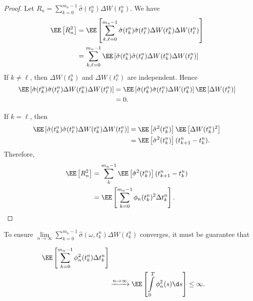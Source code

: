 \begin{proof}
    Let $R_n=\sum\limits_{k=0}^{m_n-1} \hat{\sigma}(t_k^n)\Delta W(t^n_{k})$. We have
    \begin{align*}
        \EE\left[R_n^2\right]
         & = \EE\left[\sum\limits_{k,\ell = 0}^{m_n-1}\hat{\sigma}(t_k^n)\hat{\sigma}(t_\ell^n)\Delta W(t^n_{k}) \Delta W(t^n_{\ell})\right] \\
         & = \sum\limits_{k,\ell = 0}^{m_n-1}\EE\left[\hat{\sigma}(t_k^n)\hat{\sigma}(t_\ell^n)\Delta W(t^n_{k}) \Delta W(t^n_{\ell})\right]
    \end{align*}
    If $k \ne \ell$, then $\Delta W(t^n_{k})$ and $\Delta W(t^n_{\ell})$ are independent. Hence
    \begin{align*}
        \EE\left[\hat{\sigma}(t_k^n)\hat{\sigma}(t_\ell^n)\Delta W(t^n_{k}) \Delta W(t^n_{\ell})\right]
         & = \EE\left[\hat{\sigma}(t_k^n)\hat{\sigma}(t_\ell^n)\Delta W(t^n_{k})\right]\EE\left[\Delta W(t^n_{\ell})\right] \\
         & =0.
    \end{align*}

    If $k = \ell$, then
    \begin{align*}
        \EE\left[\hat{\sigma}(t_k^n)\hat{\sigma}(t_\ell^n)\Delta W(t^n_{k}) \Delta W(t^n_{\ell})\right]
         & =\EE\left[\hat{\sigma}^2(t_k^n)\right] \EE\left[\Delta W(t^n_{k})^2\right] \\
         & = \EE\left[\hat{\sigma}^2(t_k^n)\right] (t_{k+1}^n-t_k^n).
    \end{align*}
    Therefore,
    \begin{align*}
        \EE\left[R_n^2\right]
         & =\sum\limits_{k}^{m_n-1} \EE\left[\hat{\sigma}^2(t_k^n)\right] (t_{k+1}^n-t_k^n) \\
         & =\EE\left[\sum\limits_{k=0}^{m_n-1} \phi_n(t_{k}^n)^2 \Delta t_k^n\right].
    \end{align*}
\end{proof}

To ensure $\lim\limits_{n\to\infty}\sum\limits_{k=0}^{m_n-1} \hat{\sigma}(\omega, t_k^n)\Delta W(t^n_{k})$ converges, it must be guarantee that

\begin{align*}
    \EE\left[\sum\limits_{k=0}^{m_n-1} \phi_n^2(t_{k}^n) \Delta t_k^n\right]                    \\
     & \xrightarrow{n\to\infty}  \EE\left[\int\limits_{0}^T \phi_n^2(s) \d s\right] \le \infty.
\end{align*}

